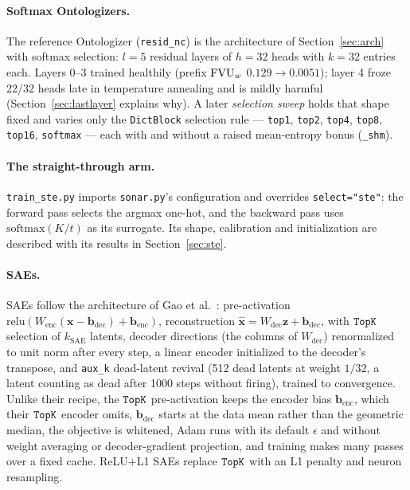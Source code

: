 \paragraph{Softmax Ontologizers.}
The reference Ontologizer (\texttt{resid\_nc}) is the architecture of
Section~\ref{sec:arch} with softmax selection: $l{=}5$ residual layers of
$h{=}32$ heads with $k{=}32$ entries each. Layers 0--3 trained healthily
(prefix $\mathrm{FVU}_w$ $0.129 \to 0.0051$); layer 4 froze 22/32 heads late in
temperature annealing and is mildly harmful (Section~\ref{sec:lastlayer}
explains why). A later \emph{selection sweep} holds that shape fixed and
varies only the \texttt{DictBlock} selection rule --- \texttt{top1},
\texttt{top2}, \texttt{top4}, \texttt{top8}, \texttt{top16},
\texttt{softmax} --- each with and without a raised mean-entropy bonus
(\texttt{\_shm}).

\paragraph{The straight-through arm.}
\texttt{train\_ste.py} imports \texttt{sonar.py}'s configuration and
overrides \texttt{select="ste"}: the forward pass selects the argmax
one-hot, and the backward pass uses $\mathrm{softmax}(K/t)$ as its
surrogate. Its shape, calibration and initialization are described with
its results in Section~\ref{sec:ste}.

\paragraph{SAEs.}
SAEs follow the architecture of Gao et al.~\cite{gao2024}: pre-activation
$\mathrm{relu}(W_{\mathrm{enc}}(\mathbf{x}-\mathbf{b}_{\mathrm{dec}})+\mathbf{b}_{\mathrm{enc}})$,
reconstruction $\hat{\mathbf{x}} = W_{\mathrm{dec}}\mathbf{z} + \mathbf{b}_{\mathrm{dec}}$,
with $\mathop{\mathtt{TopK}}\limits$ selection of $k_{\mathrm{SAE}}$ latents, decoder directions
(the columns of $W_{\mathrm{dec}}$) renormalized to unit norm after every
step, a linear encoder initialized to the decoder's transpose, and
\texttt{aux\_k} dead-latent revival (512 dead latents at weight $1/32$, a
latent counting as dead after 1000 steps without firing), trained to
convergence. Unlike their recipe, the $\mathop{\mathtt{TopK}}\limits$ pre-activation keeps the
encoder bias $\mathbf{b}_{\mathrm{enc}}$, which their $\mathop{\mathtt{TopK}}\limits$ encoder
omits, $\mathbf{b}_{\mathrm{dec}}$ starts at the
data mean rather than the geometric median, the objective is whitened,
Adam runs with its default $\epsilon$ and without weight averaging or
decoder-gradient projection, and training makes many passes over a fixed
cache. ReLU+L1 SAEs replace $\mathop{\mathtt{TopK}}\limits$ with an L1 penalty and neuron
resampling.

